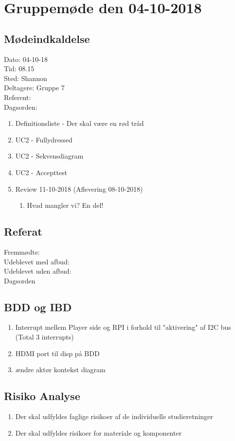\section{Gruppemøde den 04-10-2018}
\subsection{Mødeindkaldelse}
Dato: 04-10-18
\\Tid: 08.15
\\Sted: Shannon
\\Deltagere: Gruppe 7
\\Referent: 
\\Dagsorden:
\begin{enumerate}
    \item Definitionsliste - Der skal være en rød tråd
    \item UC2 - Fullydressed
    \item UC2 - Sekvensdiagram
    \item UC2 - Accepttest 
    \item Review 11-10-2018 (Aflevering 08-10-2018)
    \begin{enumerate}
        \item Hvad mangler vi? En del! 
    \end{enumerate}
\end{enumerate}

\subsection{Referat}
 Fremmødte: 
 \\Udeblevet med afbud:
 \\Udeblevet uden afbud: 
 \\Dagsorden 
 
 \subsection{BDD og IBD}
 \begin{enumerate}
    \item Interrupt mellem Player side og RPI i forhold til "aktivering" af I2C bus (Total 3 interrupts)
    \item HDMI port til disp på BDD
    \item ændre aktør kontekst diagram
\end{enumerate}

\subsection{Risiko Analyse}
\begin{enumerate}
    \item Der skal udfyldes faglige risikoer af de individuelle studieretninger
    \item Der skal udfyldes risikoer for materiale og komponenter
\end{enumerate}{}

